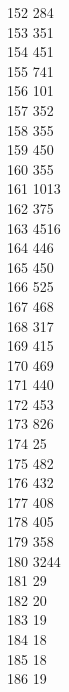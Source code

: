 { 152	284 \\
 153	351 \\
 154	451 \\
 155	741 \\
 156	101 \\
 157	352 \\
 158	355 \\
 159	450 \\
 160	355 \\
 161	1013 \\
 162	375 \\
 163	4516 \\
 164	446 \\
 165	450 \\
 166	525 \\
 167	468 \\
 168	317 \\
 169	415 \\
 170	469 \\
 171	440 \\
 172	453 \\
 173	826 \\
 174	25 \\
 175	482 \\
 176	432 \\
 177	408 \\
 178	405 \\
 179	358 \\
 180	3244 \\
 181	29 \\
 182	20 \\
 183	19 \\
 184	18 \\
 185	18 \\
 186	19 \\
}

